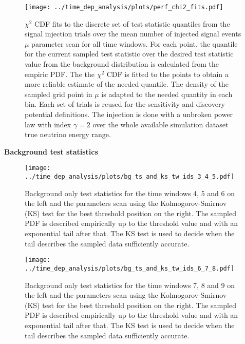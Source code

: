 \begin{figure}[H]
  \centering
  \texttt{[image: ../time\_dep\_analysis/plots/perf\_chi2\_fits.pdf]}
  \caption[$\chi^2$ CDF fits per time window for the analysis performance]{
     $\chi^2$ CDF fits to the discrete set of test statistic quantiles from the signal injection trials over the mean number of injected signal events $\mu$ parameter scan for all time windows.
     For each point, the quantile for the current sampled test statistic over the desired test statistic value from the background distribution is calculated from the empiric PDF.
     The the $\chi^2$ CDF is fitted to the points to obtain a more reliable estimate of the needed quantile.
     The density of the sampled grid point in $\mu$ is adapted to the needed quantity in each bin.
     Each set of trials is reused for the sensitivity and discovery potential definitions.
     The injection is done with a unbroken power law with index $\gamma=2$ over the whole available simulation dataset true neutrino energy range.
  }
  \label{fig:tdep_perf_chi2_fits}
\end{figure}


\textbf{\Large\sffamily Background test statistics}
\begin{figure}[H]
  \centering
  \texttt{[image: ../time\_dep\_analysis/plots/bg\_ts\_and\_ks\_tw\_ids\_3\_4\_5.pdf]}
  \caption[Background test statistics for the time windows 4, 5 and 6]{
    Background only test statistics for the time windows 4, 5 and 6 on the left and the parameters scan using the Kolmogorov-Smirnov (KS) test for the best threshold position on the right.
    The sampled PDF is described empirically up to the threshold value and with an exponential tail after that.
    The KS test is used to decide when the tail describes the sampled data sufficiently accurate.
  }
  \label{fig:bg_ts_and_ks_tw_ids_3_4_5}
\end{figure}

\begin{figure}[H]
  \centering
  \texttt{[image: ../time\_dep\_analysis/plots/bg\_ts\_and\_ks\_tw\_ids\_6\_7\_8.pdf]}
  \caption[Background test statistics for the time windows 7, 8 and 9]{
    Background only test statistics for the time windows 7, 8 and 9 on the left and the parameters scan using the Kolmogorov-Smirnov (KS) test for the best threshold position on the right.
    The sampled PDF is described empirically up to the threshold value and with an exponential tail after that.
    The KS test is used to decide when the tail describes the sampled data sufficiently accurate.
  }
  \label{fig:bg_ts_and_ks_tw_ids_6_7_8}
\end{figure}

